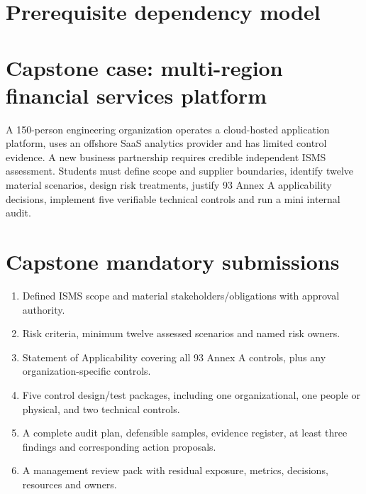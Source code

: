 \documentclass[11pt,letterpaper]{article}
\begin{document}
\section{Prerequisite dependency model}
\begin{center}\end{center}
\section{Capstone case: multi-region financial services platform}
A 150-person engineering organization operates a cloud-hosted application platform, uses an offshore SaaS analytics provider and has limited control evidence. A new business partnership requires credible independent ISMS assessment. Students must define scope and supplier boundaries, identify twelve material scenarios, design risk treatments, justify 93 Annex A applicability decisions, implement five verifiable technical controls and run a mini internal audit.
\section{Capstone mandatory submissions}
\begin{enumerate}
\item Defined ISMS scope and material stakeholders/obligations with approval authority.
\item Risk criteria, minimum twelve assessed scenarios and named risk owners.
\item Statement of Applicability covering all 93 Annex A controls, plus any organization-specific controls.
\item Five control design/test packages, including one organizational, one people or physical, and two technical controls.
\item A complete audit plan, defensible samples, evidence register, at least three findings and corresponding action proposals.
\item A management review pack with residual exposure, metrics, decisions, resources and owners.
\end{enumerate}
\end{document}
